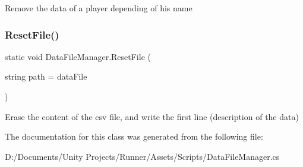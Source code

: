 Remove the data of a player depending of his name \mbox{\label{class_data_file_manager_a216fccaf83f9be400a0b8df1466f1ce0}} 
\subsubsection{\texorpdfstring{Reset\+File()}{ResetFile()}}
{\footnotesize\ttfamily static void Data\+File\+Manager.\+Reset\+File (\begin{DoxyParamCaption}\item[{string}]{path = {\ttfamily dataFile} }\end{DoxyParamCaption})\hspace{0.3cm}{\ttfamily [static]}}

Erase the content of the csv file, and write the first line (description of the data) 

The documentation for this class was generated from the following file\+:\begin{DoxyCompactItemize}
\item 
D\+:/\+Documents/\+Unity Projects/\+Runner/\+Assets/\+Scripts/Data\+File\+Manager.\+cs\end{DoxyCompactItemize}
